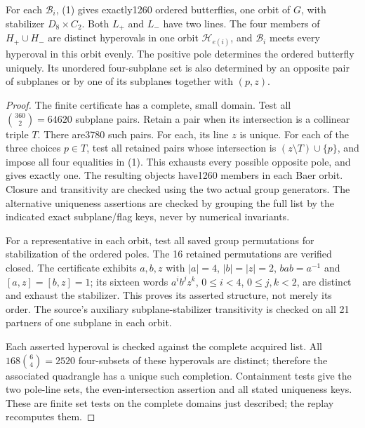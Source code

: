 \documentclass[11pt]{article}
\newcommand{\orb}{\mathcal B}\newcommand{\hyp}{\mathcal H}
\begin{document}
\begin{lemma}
For each $\orb_i$, (1) gives exactly1260 ordered butterflies, one orbit of
$G$, with stabilizer $D_8\times C_2$. Both $L_+$ and $L_-$ have two lines.
The four members of $H_+\cup H_-$ are distinct hyperovals in one orbit
$\hyp_{e(i)}$, and $\orb_i$ meets every hyperoval in this orbit evenly.
The positive pole determines the ordered butterfly uniquely. Its unordered
four-subplane set is also determined by an opposite pair of subplanes or by
one of its subplanes together with $(p,z)$.
\end{lemma}
\begin{proof}
The finite certificate has a complete, small domain. Test all
$\binom{360}{2}=64620$ subplane pairs. Retain a pair when its intersection
is a collinear triple $T$. There are3780 such pairs. For each, its line $z$
is unique. For each of the three choices $p\in T$, test all retained pairs
whose intersection is $(z\setminus T)\cup\{p\}$, and impose all four
equalities in (1). This exhausts every possible opposite pole, and gives
exactly one. The resulting objects have1260 members in each Baer orbit.
Closure and transitivity are checked using the two actual group generators.
The alternative uniqueness assertions are checked by grouping the full list
by the indicated exact subplane/flag keys, never by numerical invariants.

For a representative in each orbit, test all saved group permutations for
stabilization of the ordered poles. The 16 retained permutations are verified
closed. The certificate exhibits $a,b,z$ with $|a|=4$, $|b|=|z|=2$,
$bab=a^{-1}$ and $[a,z]=[b,z]=1$; its sixteen words
$a^ib^jz^k$, $0\leq i<4$, $0\leq j,k<2$, are distinct and exhaust the
stabilizer. This proves its asserted structure, not merely its order.
The source's auxiliary subplane-stabilizer transitivity is checked on all
21 partners of one subplane in each orbit.

Each asserted hyperoval is checked against the complete acquired list.
All $168\binom64=2520$ four-subsets of these hyperovals are distinct;
therefore the associated quadrangle has a unique such completion.
Containment tests give the two pole-line sets, the even-intersection
assertion and all stated uniqueness keys. These are finite set tests on the
complete domains just described; the replay recomputes them.
\end{proof}
\end{document}

